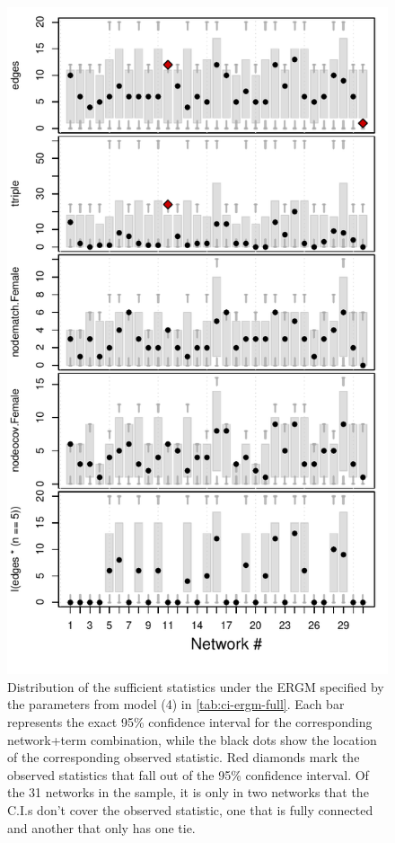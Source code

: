 \documentclass[review, nonatbib,doubleblind]{elsarticle/elsarticle}
\begin{document}
\begin{figure}[p]
    \centering
    \includegraphics[]{figures/ci-ergmito-gof-full.pdf}
    \caption{Distribution of the sufficient statistics under the ERGM specified by the parameters from model (4) in \autoref{tab:ci-ergm-full}. Each bar represents the exact 95\% confidence interval for the corresponding network+term combination, while the black dots show the location of the corresponding observed statistic. Red diamonds mark the observed statistics that fall out of the 95\% confidence interval. Of the 31 networks in the sample, it is only in two networks that the C.I.s don't cover the observed statistic, one that is fully connected and another that only has one tie.}
    \label{fig:ci-gof-full}
\end{figure}
\end{document}

